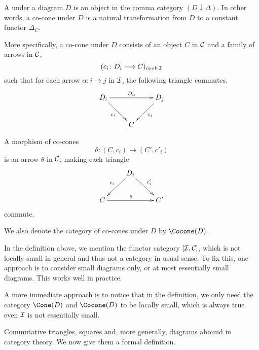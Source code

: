 \begin{defn}
  A  under a diagram $D$ is an object in the comma category $(D\downarrow\Delta)$. In other words, a co-cone under $D$ is a natural transformation from $D$ to a constant functor $\Delta_C$.

  More specifically, a co-cone under $D$ consists of an object $C$ in ${\cal C}$ and a family of arrows in ${\cal C}$,
  \begin{equation*}
    (c_i\colon D_i\longrightarrow C)_{i\in\operatorname{ob}{\cal I}}
  \end{equation*}
  such that for each arrow $\alpha\colon i\to j$ in ${\cal I}$, the following triangle commutes.
  \begin{displaymath}
      \xymatrix{
         D_i\ar[rr]^{D_{\alpha}}\ar[rd]_{c_i}&&D_j\ar[ld]^{c_j} \\
         &C&
      }
  \end{displaymath}

  A morphism of co-cones
  \begin{equation*}
    \theta\colon (C,c_i)\longrightarrow (C',c'_i)
  \end{equation*}
  is an arrow $\theta$ in ${\cal C}$, making each triangle
  \begin{displaymath}
      \xymatrix{
         &D_i\ar[ld]_{c_i}\ar[rd]^{c'_i}& \\
         C\ar[rr]^{\theta}&&C'
      }
  \end{displaymath}
  commute.
\end{defn}
\begin{rem}
  We also denote the category of co-cones under $D$ by $\Cocone(D)$.
\end{rem}

\begin{rem}
  In the definition above, we mention the functor category $[{\cal I},{\cal C}]$, which is not locally small in general and thus not a category in usual sense. To fix this, one approach is to consider small diagrams only, or at most essentially small diagrams. This works well in practice.

  A more immediate approach is to notice that in the definition, we only need the category $\Cone(D)$ and $\Cocone(D)$ to be locally small, which is always true even ${\cal I}$ is not essentially small.
\end{rem}

Commutative triangles, squares and, more generally, diagrams abound in category theory. We now give them a formal definition.

